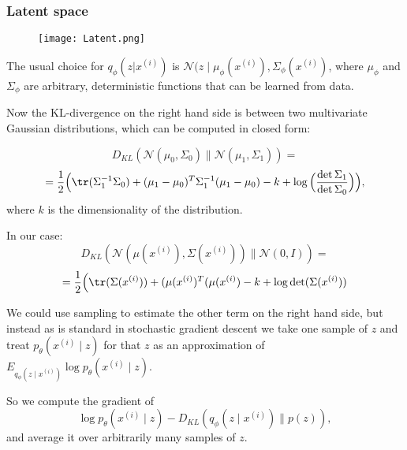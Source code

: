 \documentclass[t]{beamer}
\begin{document}
\begin{frame}
  \frametitle{Latent space}

  \begin{figure}
   \texttt{[image: Latent.png]}
  \end{figure}
\end{frame}

\begin{frame}
  The usual choice for $q_{\phi}(z| x^{(i)})$ is
  $\mathcal{N}(z\mid \mu_\phi(x^{(i)}),
  \Sigma_\phi(x^{(i)})$, where $\mu_\phi$ and $\Sigma_\phi$
  are arbitrary, deterministic functions that can be learned
  from data.
 
  \vspace{2mm}

  Now the KL-divergence on the right hand side is between
  two multivariate Gaussian distributions, which can be
  computed in closed form:

  \vspace{1mm}
  
  \[
    D_{KL}(\mathcal{N}(\mu_0, \Sigma_0)\| \mathcal{N}(\mu_1,
    \Sigma_1)) =
  \]
  \[
    = \frac{1}{2}\Big(\tr (\Sigma_1^{-1}\Sigma_0)+
    (\mu_1-\mu_0)^T \Sigma_1^{-1}(\mu_1-\mu_0)-k +\log
    \Big(\frac{\det \Sigma_1}{\det \Sigma_0}\Big)\Big),
  \]
  where $k$ is the dimensionality of the distribution.
\end{frame}
  
\begin{frame}
  In our case:
  \[
    D_{KL}(\mathcal{N}(\mu(x^{(i)}), \Sigma(x^{(i)}))\|
    \mathcal{N}(0,I)) =
  \]
  \[
    = \frac{1}{2}\Big(\tr (\Sigma(x^{(i)}))+ (\mu(x^{(i)})^T
    (\mu(x^{(i)})-k +\log
    \det(\Sigma(x^{(i)}))
  \]

  We could use sampling to estimate the other term on the
  right hand side, but instead as is standard in stochastic
  gradient descent we take one sample of $z$ and treat
  $p_\theta(x^{(i)}\mid z)$ for that $z$ as an approximation
  of
  $E_{q_{\phi}(z\mid x^{(i)})}\log p_{\theta}(x^{(i)}\mid
  z)$.

  \vspace{1mm}

  So we compute the gradient of
  \[
    \log p_{\theta}(x^{(i)}\mid z)- D_{KL}(q_{\phi}(z\mid
    x^{(i)})\| p(z)),
  \]
  and average it over arbitrarily many samples of $z$. 
\end{frame}
\end{document}
